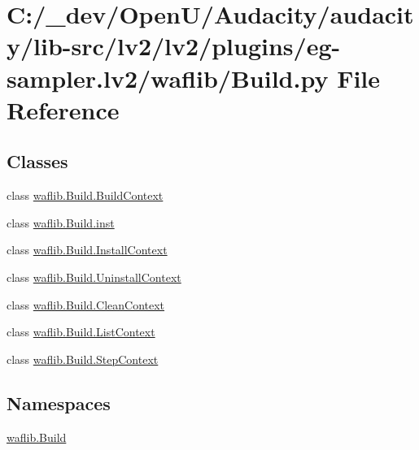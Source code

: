 \hypertarget{lv2_2plugins_2eg-sampler_8lv2_2waflib_2_build_8py}{}\section{C\+:/\+\_\+dev/\+Open\+U/\+Audacity/audacity/lib-\/src/lv2/lv2/plugins/eg-\/sampler.lv2/waflib/\+Build.py File Reference}
\label{lv2_2plugins_2eg-sampler_8lv2_2waflib_2_build_8py}
\subsection*{Classes}
\begin{DoxyCompactItemize}
\item 
class \hyperlink{classwaflib_1_1_build_1_1_build_context}{waflib.\+Build.\+Build\+Context}
\item 
class \hyperlink{classwaflib_1_1_build_1_1inst}{waflib.\+Build.\+inst}
\item 
class \hyperlink{classwaflib_1_1_build_1_1_install_context}{waflib.\+Build.\+Install\+Context}
\item 
class \hyperlink{classwaflib_1_1_build_1_1_uninstall_context}{waflib.\+Build.\+Uninstall\+Context}
\item 
class \hyperlink{classwaflib_1_1_build_1_1_clean_context}{waflib.\+Build.\+Clean\+Context}
\item 
class \hyperlink{classwaflib_1_1_build_1_1_list_context}{waflib.\+Build.\+List\+Context}
\item 
class \hyperlink{classwaflib_1_1_build_1_1_step_context}{waflib.\+Build.\+Step\+Context}
\end{DoxyCompactItemize}
\subsection*{Namespaces}
\begin{DoxyCompactItemize}
\item 
 \hyperlink{namespacewaflib_1_1_build}{waflib.\+Build}
\end{DoxyCompactItemize}
